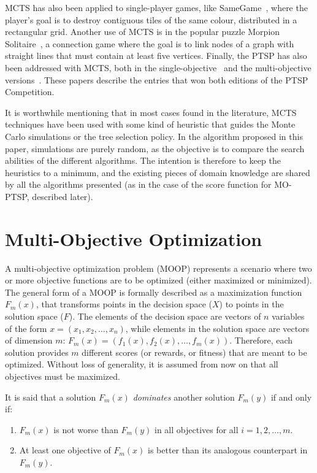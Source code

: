 \documentclass[journal]{IEEEtran}
\begin{document}
MCTS has also been applied to single-player games, like SameGame~\cite{Matsumoto2010}, where the player's goal is to destroy contiguous tiles of the same colour, distributed in a rectangular grid. Another use of MCTS is in the popular puzzle Morpion Solitaire~\cite{Edelkamp2010}, a connection game where the goal is to link nodes of a graph with straight lines that must contain at least five vertices. Finally, the PTSP has also been addressed with MCTS, both in the single-objective~\cite{Perez2013, Powley2012} and the multi-objective versions~\cite{Powley2013}. These papers describe the entries that won both editions of the PTSP Competition.

It is worthwhile mentioning that in most cases found in the literature, MCTS techniques have been used with some kind of heuristic that guides the Monte Carlo simulations or the tree selection policy. In the algorithm proposed in this paper, simulations are purely random, as the objective is to compare the search abilities of the different algorithms. The intention is therefore to keep the heuristics to a minimum, and the existing pieces of domain knowledge are shared by all the algorithms presented (as in the case of the score function for MO-PTSP, described later).


\section{Multi-Objective Optimization} \label{sec:moo}

A multi-objective optimization problem (MOOP) represents a scenario where two or more objective functions are to be optimized (either maximized or minimized). The general form of a MOOP is formally described as a maximization function $F_m(x)$, that transforms points in the decision space ($X$) to points in the solution space ($F$). The elements of the decision space are vectors of $n$ variables of the form $x = (x_1, x_2, \dots, x_n)$, while elements in the solution space are vectors of dimension $m$: $F_m(x) = (f_1(x), f_2(x), \dots, f_m(x))$. Therefore, each solution provides $m$ different scores (or rewards, or fitness) that are meant to be optimized. Without loss of generality, it is assumed from now on that all objectives must be maximized.

It is said that a solution $F_m(x)$ \textit{dominates} another solution $F_m(y)$ if and only if:

\begin{enumerate}
\item $F_m(x)$ is not worse than $F_m(y)$ in all objectives for all $i = 1, 2, \dots, m$.
\item At least one objective of $F_m(x)$ is better than its analogous counterpart in $F_m(y)$.
\end{enumerate}
\end{document}
